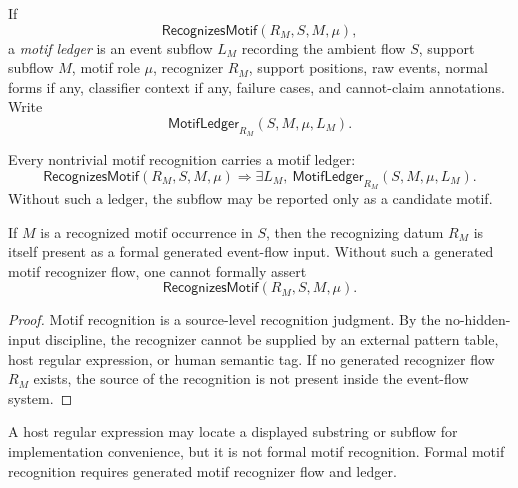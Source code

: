 \begin{definition}
\label{def:motif-report-ledger}
If
$$
  \mathsf{RecognizesMotif}(R_M,S,M,\mu),
$$
a \emph{motif ledger} is an event subflow $L_M$ recording the ambient flow $S$, support subflow $M$, motif role $\mu$, recognizer $R_M$, support positions, raw events, normal forms if any, classifier context if any, failure cases, and cannot-claim annotations. Write
$$
  \mathsf{MotifLedger}_{R_M}(S,M,\mu,L_M).
$$
\end{definition}

\begin{principle}
\label{prin:motif-report-no-recognized-without-ledger}
Every nontrivial motif recognition carries a motif ledger:
$$
  \mathsf{RecognizesMotif}(R_M,S,M,\mu)
  \Rightarrow
  \exists L_M,\ \mathsf{MotifLedger}_{R_M}(S,M,\mu,L_M).
$$
Without such a ledger, the subflow may be reported only as a candidate motif.
\end{principle}

\begin{theorem}
\label{thm:motif-report-requires-generated-recognizer}
If $M$ is a recognized motif occurrence in $S$, then the recognizing datum $R_M$ is itself present as a formal generated event-flow input. Without such a generated motif recognizer flow, one cannot formally assert
$$
  \mathsf{RecognizesMotif}(R_M,S,M,\mu).
$$
\end{theorem}

\begin{proof}
Motif recognition is a source-level recognition judgment. By the no-hidden-input discipline, the recognizer cannot be supplied by an external pattern table, host regular expression, or human semantic tag. If no generated recognizer flow $R_M$ exists, the source of the recognition is not present inside the event-flow system.
\end{proof}

\begin{corollary}
\label{cor:motif-report-host-regex-not-recognizer}
A host regular expression may locate a displayed substring or subflow for implementation convenience, but it is not formal motif recognition. Formal motif recognition requires generated motif recognizer flow and ledger.
\end{corollary}

